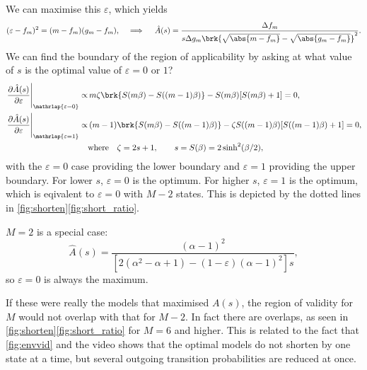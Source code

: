 \documentclass[12pt]{article}
\renewcommand{\pdiff}[2]{\frac{\partial #1}{\partial #2}}
\begin{document}
We can maximise this \wrt \(\varepsilon\), which yields
%
\begin{equation}\label{eq:shortopt}
  (\varepsilon - f_m)^2 = (m - f_m)(g_m - f_m),
  \quad \implies \quad
  \hat{A}(s) = \frac{\Delta f_{m}}
      {s \Delta g_{m} \brk{\sqrt{\abs{m - f_m}} - \sqrt{\abs{g_m - f_m}}}^2}.
\end{equation}
%
We can find the boundary of the region of applicability by asking at what value of \(s\) is the optimal value of \(\varepsilon=0\) or \(1\)?
%
\begin{equation}\label{eq:shortenvalid}
\begin{aligned}
  \left.\pdiff{\hat{A}(s)}{\varepsilon}\right|_{\mathrlap{\varepsilon=0}} \propto &\,
    m \zeta \brk{S(m\beta) - S((m-1)\beta)} - S(m\beta) [S(m\beta) + 1]
      = 0,\\
  \left.\pdiff{\hat{A}(s)}{\varepsilon}\right|_{\mathrlap{\varepsilon=1}} \propto &\,
    (m-1)\brk{S(m\beta) - S((m-1)\beta)} - \zeta S((m-1)\beta) [S((m-1)\beta) + 1]
      = 0,\\
    &\text{where}\quad
    \zeta = 2s + 1, \qquad
    s = S(\beta) = 2 \sinh^2(\beta/2),
\end{aligned}
\end{equation}
%
with the \(\varepsilon=0\) case providing the lower boundary and \(\varepsilon=1\) providing the upper boundary.
For lower \(s\), \(\varepsilon = 0\) is the optimum. 
For higher \(s\), \(\varepsilon = 1\) is the optimum, which is eqivalent to \(\varepsilon = 0\) with \(M-2\) states.
This is depicted by the dotted lines in \cref{fig:shorten}\ref{fig:short_ratio}.

\(M=2\) is a special case:
%
\begin{equation*}
  \hat{A}(s) = \frac{(\alpha-1)^2}
                    {[2(\alpha^2-\alpha+1) - (1-\varepsilon) (\alpha-1)^2]s},
\end{equation*}
%
so \(\varepsilon=0\) is always the maximum.

If these were really the models that maximised \(A(s)\), the region of validity for \(M\) would not overlap with that for \(M-2\).
In fact there are overlaps, as seen in \cref{fig:shorten}\ref{fig:short_ratio} for \(M=6\) and higher.
This is related to the fact that \cref{fig:envvid} and the video shows that the optimal models do not shorten by one state at a time, but several outgoing transition probabilities are reduced at once.

\end{document}
